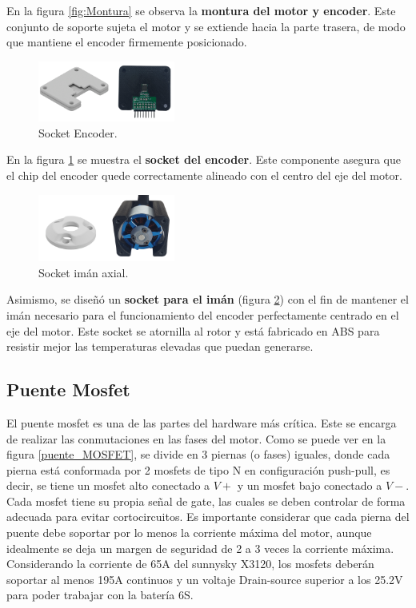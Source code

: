 \documentclass[11pt]{report}
\begin{document}
En la figura \ref{fig:Montura} se observa la \textbf{montura del motor y encoder}. Este conjunto de soporte sujeta el motor y se extiende hacia la parte trasera, de modo que mantiene el encoder firmemente posicionado.

\begin{figure}[ht]
	\centering
	\includegraphics[width=0.4\textwidth]{imagenes/Motor/encoder.png}
	\caption{Socket Encoder.}
	\label{fig:encoder}
\end{figure}
\FloatBarrier

En la figura \ref{fig:encoder} se muestra el \textbf{socket del encoder}. Este componente asegura que el chip del encoder quede correctamente alineado con el centro del eje del motor.

\begin{figure}[ht]
	\centering
	\includegraphics[width=0.4\textwidth]{imagenes/Motor/iman.png}
	\caption{Socket imán axial.}
	\label{fig:iman}
\end{figure}
\FloatBarrier

Asimismo, se diseñó un \textbf{socket para el imán} (figura \ref{fig:iman}) con el fin de mantener el imán necesario para el funcionamiento del encoder perfectamente centrado en el eje del motor. Este socket se atornilla al rotor y está fabricado en ABS para resistir mejor las temperaturas elevadas que puedan generarse.

\newpage
\subsection{Puente Mosfet}

El puente mosfet es una de las partes del hardware más crítica. Este se encarga de realizar las conmutaciones en las fases del motor. Como se puede ver en la figura \ref{puente_MOSFET}, se divide en 3 piernas (o fases) iguales, donde cada pierna está conformada por 2 mosfets de tipo N en configuración push-pull, es decir, se tiene un mosfet alto conectado a $V+$ y un mosfet bajo conectado a $V-$. Cada mosfet tiene su propia señal de gate, las cuales se deben controlar de forma adecuada para evitar cortocircuitos. Es importante considerar que cada pierna del puente debe soportar por lo menos la corriente máxima del motor, aunque idealmente se deja un margen de seguridad de 2 a 3 veces la corriente máxima. Considerando la corriente de 65A del sunnysky X3120, los mosfets deberán soportar al menos 195A continuos y un voltaje Drain-source superior a los 25.2V para poder trabajar con la batería 6S.
\end{document}
